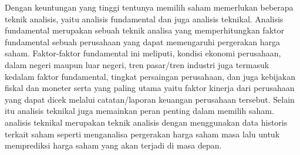 \begin{subs}
	Dengan keuntungan yang tinggi tentunya memilih saham memerlukan beberapa teknik analisis, yaitu analisis fundamental dan juga analisis teknikal. Analisis fundamental merupakan sebuah teknik analisa yang memperhitungkan faktor fundamental sebuah perusahaan yang dapat memengaruhi pergerakan harga saham. Faktor-faktor fundamental ini meliputi, kondisi ekonomi perusahaan, dalam negeri maupun luar negeri, tren pasar/tren industri juga termasuk kedalam faktor fundamental, tingkat persaingan perusahaan, dan juga kebijakan fiskal dan moneter serta yang paling utama yaitu faktor kinerja dari perusahaan yang dapat dicek melalui catatan/laporan keuangan perusahaan tersebut. Selain itu analisis teknikal juga memainkan peran penting dalam memilih saham. analisis teknikal merupakan teknik analisis dengan menggunakan data historis terkait saham seperti menganalisa pergerakan harga saham masa lalu untuk memprediksi harga saham yang akan terjadi di masa depan.
\end{subs}

